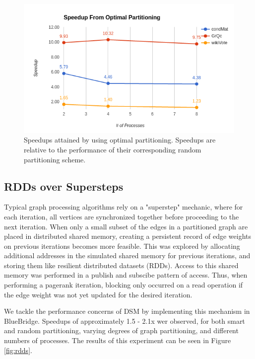 \begin{figure}[h]
\includegraphics[width=\linewidth]{"fig/smart_vs_rand"}
\caption{Speedups attained by using optimal partitioning. Speedups are relative
to the performance of their corresponding random partitioning scheme.}
\label{fig:smart_rand}
\end{figure}

\subsection{RDDs over Supersteps}

Typical graph processing algorithms rely on a "superstep" mechanic, where for
each iteration, all vertices are synchronized together before proceeding to the
next iteration. When only a small subset of the edges in a partitioned graph 
are placed in distributed shared memory, creating a persistent record of edge
weights on previous iterations becomes more feasible. This was explored by
allocating additional addresses in the simulated shared memory for previous 
iterations, and storing them like resilient distributed datasets (RDDs). Access
to this shared memory was performed in a publish and subscibe pattern of access.
Thus, when performing a pagerank iteration, blocking only occurred on a read
operation if the edge weight was not yet updated for the desired iteration.

We tackle the performance concerns of DSM by implementing this mechanism
in BlueBridge. Speedups of approximately 1.5 - 2.1x wer observed, for both smart
and random partitioning, varying degrees of graph partitioning, and different
numbers of processes. The results of this experiment can be seen in Figure
\ref{fig:rdds}.

